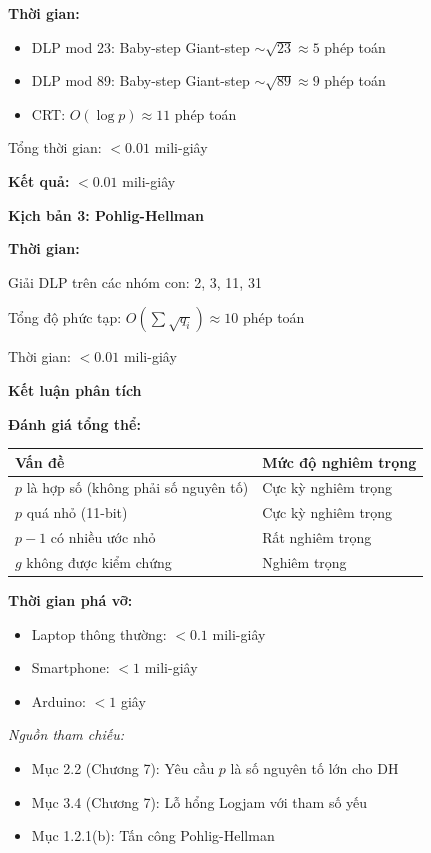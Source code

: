 \textbf{Thời gian:}
\begin{itemize}
    \item DLP mod 23: Baby-step Giant-step $\sim \sqrt{23} \approx 5$ phép toán
    \item DLP mod 89: Baby-step Giant-step $\sim \sqrt{89} \approx 9$ phép toán
    \item CRT: $O(\log p) \approx 11$ phép toán
\end{itemize}

Tổng thời gian: $< 0.01$ mili-giây

\textbf{Kết quả:} $< 0.01$ mili-giây

\textbf{Kịch bản 3: Pohlig-Hellman}

\textbf{Thời gian:}

Giải DLP trên các nhóm con: 2, 3, 11, 31

Tổng độ phức tạp: $O(\sum \sqrt{q_i}) \approx 10$ phép toán

Thời gian: $< 0.01$ mili-giây

\textbf{Kết luận phân tích}

\textbf{Đánh giá tổng thể:}

\begin{center}
\begin{tabular}{|p{5cm}|p{4cm}|}
\hline
\textbf{Vấn đề} & \textbf{Mức độ nghiêm trọng} \\
\hline
$p$ là hợp số (không phải số nguyên tố) & Cực kỳ nghiêm trọng \\
$p$ quá nhỏ (11-bit) & Cực kỳ nghiêm trọng \\
$p-1$ có nhiều ước nhỏ & Rất nghiêm trọng \\
$g$ không được kiểm chứng & Nghiêm trọng \\
\hline
\end{tabular}
\end{center}

\textbf{Thời gian phá vỡ:}
\begin{itemize}
    \item Laptop thông thường: $< 0.1$ mili-giây
    \item Smartphone: $< 1$ mili-giây
    \item Arduino: $< 1$ giây
\end{itemize}

\vspace{0.2cm}
\textit{Nguồn tham chiếu:}
\begin{itemize}
    \item Mục 2.2 (Chương 7): Yêu cầu $p$ là số nguyên tố lớn cho DH
    \item Mục 3.4 (Chương 7): Lỗ hổng Logjam với tham số yếu
    \item Mục 1.2.1(b): Tấn công Pohlig-Hellman
\end{itemize}

